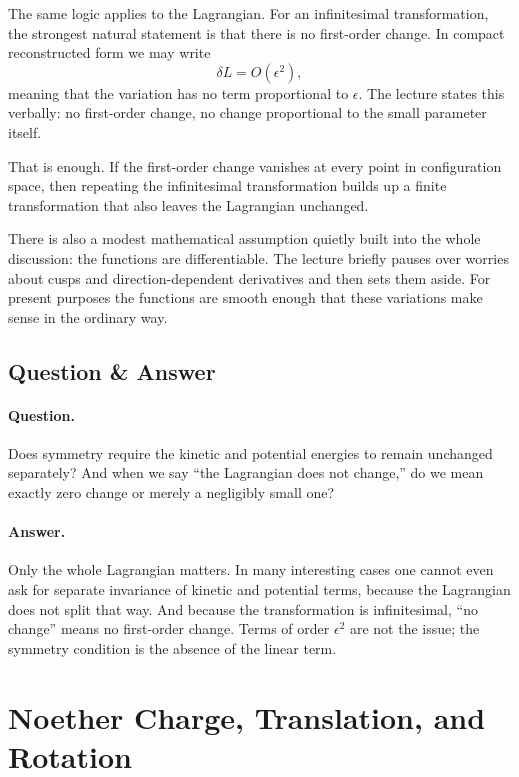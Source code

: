 The same logic applies to the Lagrangian. For an infinitesimal transformation, the strongest natural statement is that there is no first-order change. In compact reconstructed form we may write
\begin{equation}
\delta L = O(\epsilon^2),
\end{equation}
meaning that the variation has no term proportional to \(\epsilon\). The lecture states this verbally: no first-order change, no change proportional to the small parameter itself.

That is enough. If the first-order change vanishes at every point in configuration space, then repeating the infinitesimal transformation builds up a finite transformation that also leaves the Lagrangian unchanged.

There is also a modest mathematical assumption quietly built into the whole discussion: the functions are differentiable. The lecture briefly pauses over worries about cusps and direction-dependent derivatives and then sets them aside. For present purposes the functions are smooth enough that these variations make sense in the ordinary way.

\subsection{Question \& Answer}

\paragraph{Question.} Does symmetry require the kinetic and potential energies to remain unchanged separately? And when we say ``the Lagrangian does not change,'' do we mean exactly zero change or merely a negligibly small one?

\paragraph{Answer.} Only the whole Lagrangian matters. In many interesting cases one cannot even ask for separate invariance of kinetic and potential terms, because the Lagrangian does not split that way. And because the transformation is infinitesimal, ``no change'' means no first-order change. Terms of order \(\epsilon^2\) are not the issue; the symmetry condition is the absence of the linear term.

\section{Noether Charge, Translation, and Rotation}

